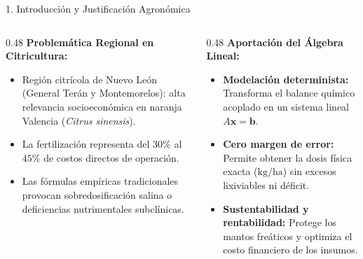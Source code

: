 \documentclass[
  spanish,
  aspectratio=169,
  xcolor={dvipsnames,table}
]{beamer}
\begin{document}
\begin{frame}{1. Introducción y Justificación Agronómica}
  \begin{columns}[T]
    \begin{column}{0.48\textwidth}
      \textbf{\color{uanlblue}Problemática Regional en Citricultura:}
      \begin{itemize}
        \item Región citrícola de Nuevo León (General Terán y Montemorelos): alta relevancia socioeconómica en naranja Valencia (\textit{Citrus sinensis}).
        \item La fertilización representa del $30\%$ al $45\%$ de costos directos de operación.
        \item Las fórmulas empíricas tradicionales provocan sobredosificación salina o deficiencias nutrimentales subclínicas.
      \end{itemize}
    \end{column}
    \begin{column}{0.48\textwidth}
      \textbf{\color{uanlblue}Aportación del Álgebra Lineal:}
      \begin{itemize}
        \item \textbf{Modelación determinista:} Transforma el balance químico acoplado en un sistema lineal $A\mathbf{x} = \mathbf{b}$.
        \item \textbf{Cero margen de error:} Permite obtener la dosis física exacta ($\text{kg/ha}$) sin excesos lixiviables ni déficit.
        \item \textbf{Sustentabilidad y rentabilidad:} Protege los mantos freáticos y optimiza el costo financiero de los insumos.
      \end{itemize}
    \end{column}
  \end{columns}
\end{frame}
\end{document}
